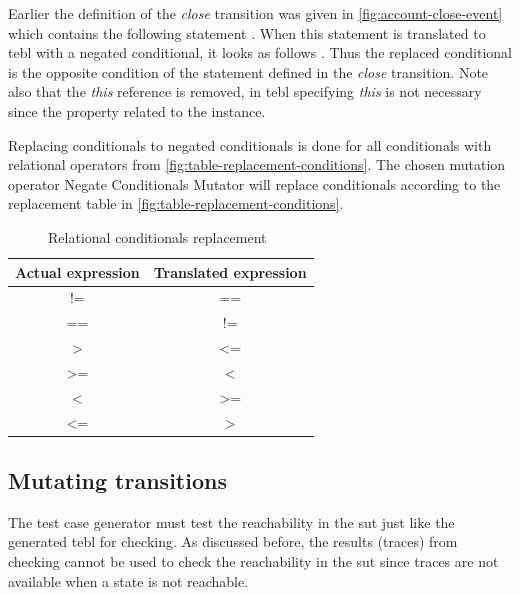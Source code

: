Earlier the definition of the \textit{close} transition was given in
\autoref{fig:account-close-event} which contains the following statement
. When this statement is translated to tebl
with a negated conditional, it looks as follows
. Thus the replaced conditional is the opposite
condition of the statement defined in the \textit{close} transition.
Note also that the \textit{this} reference is removed, in tebl specifying
\textit{this} is not necessary since the property related to the instance.

Replacing conditionals to negated conditionals is done for all conditionals with
relational operators from \autoref{fig:table-replacement-conditions}.
The chosen mutation operator Negate Conditionals Mutator will replace
conditionals according to the replacement table in \autoref{fig:table-replacement-conditions}.

\begin{table}[h!]
\centering
\begin{tabular}{cc}
\toprule
\textbf{Actual expression} & \textbf{Translated expression} \\ \midrule
!=                         & ==                             \\
==                         & !=                             \\
\textgreater               & \textless=                     \\
\textgreater=              & \textless                      \\
\textless                  & \textgreater=                  \\
\textless=                 & \textgreater                   \\ \bottomrule
\end{tabular}
\caption{Relational conditionals replacement~\cite{pitmutators}}\label{fig:table-replacement-conditions}
\end{table}
\FloatBarrier

\subsection{Mutating transitions}

The test case generator must test the reachability in the \gls{sut} just like
the generated tebl for checking. As discussed before, the results (traces) from
checking cannot be used to check the reachability in the \gls{sut} since
traces are not available when a state is not reachable.

